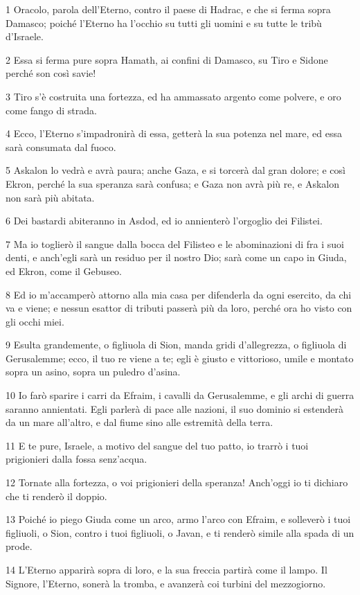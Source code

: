 \par 1 Oracolo, parola dell'Eterno, contro il paese di Hadrac, e che si ferma sopra Damasco; poiché l'Eterno ha l'occhio su tutti gli uomini e su tutte le tribù d'Israele.
\par 2 Essa si ferma pure sopra Hamath, ai confini di Damasco, su Tiro e Sidone perché son così savie!
\par 3 Tiro s'è costruita una fortezza, ed ha ammassato argento come polvere, e oro come fango di strada.
\par 4 Ecco, l'Eterno s'impadronirà di essa, getterà la sua potenza nel mare, ed essa sarà consumata dal fuoco.
\par 5 Askalon lo vedrà e avrà paura; anche Gaza, e si torcerà dal gran dolore; e così Ekron, perché la sua speranza sarà confusa; e Gaza non avrà più re, e Askalon non sarà più abitata.
\par 6 Dei bastardi abiteranno in Asdod, ed io annienterò l'orgoglio dei Filistei.
\par 7 Ma io toglierò il sangue dalla bocca del Filisteo e le abominazioni di fra i suoi denti, e anch'egli sarà un residuo per il nostro Dio; sarà come un capo in Giuda, ed Ekron, come il Gebuseo.
\par 8 Ed io m'accamperò attorno alla mia casa per difenderla da ogni esercito, da chi va e viene; e nessun esattor di tributi passerà più da loro, perché ora ho visto con gli occhi miei.
\par 9 Esulta grandemente, o figliuola di Sion, manda gridi d'allegrezza, o figliuola di Gerusalemme; ecco, il tuo re viene a te; egli è giusto e vittorioso, umile e montato sopra un asino, sopra un puledro d'asina.
\par 10 Io farò sparire i carri da Efraim, i cavalli da Gerusalemme, e gli archi di guerra saranno annientati. Egli parlerà di pace alle nazioni, il suo dominio si estenderà da un mare all'altro, e dal fiume sino alle estremità della terra.
\par 11 E te pure, Israele, a motivo del sangue del tuo patto, io trarrò i tuoi prigionieri dalla fossa senz'acqua.
\par 12 Tornate alla fortezza, o voi prigionieri della speranza! Anch'oggi io ti dichiaro che ti renderò il doppio.
\par 13 Poiché io piego Giuda come un arco, armo l'arco con Efraim, e solleverò i tuoi figliuoli, o Sion, contro i tuoi figliuoli, o Javan, e ti renderò simile alla spada di un prode.
\par 14 L'Eterno apparirà sopra di loro, e la sua freccia partirà come il lampo. Il Signore, l'Eterno, sonerà la tromba, e avanzerà coi turbini del mezzogiorno.
